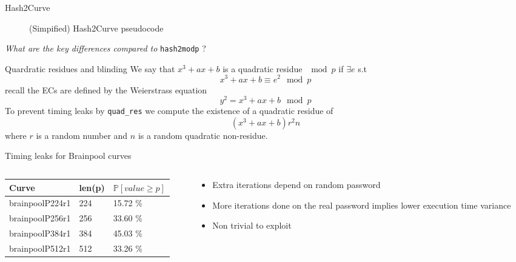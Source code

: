 \documentclass[xcolor=table]{bredelebeamer}
\begin{document}
\begin{frame}{Hash2Curve}
\begin{figure}
    \centering
\exampleCodeC
\caption{(Simpified) Hash2Curve pseudocode}
    \label{fig:my_label}
\end{figure}
    \Large{\textit{What are the key differences compared to} \texttt{hash2modp} ?}
\end{frame}
\begin{frame}{Quardratic residues and blinding}
    We say that $x^3+ax+b$ is a quadratic residue $\mod p$ if $\exists e$ s.t
    $$x^3+ax+b \equiv e^2 \mod p$$
    recall the ECs are defined by the Weierstrass equation
    $$y^2 = x^3 + ax + b \mod p$$
    To prevent timing leaks by \texttt{quad\_res} we compute the existence of a quadratic residue of
    $$(x^3+ax+b)r^2n$$
    where $r$ is a random number and $n$ is a random quadratic non-residue.
\end{frame}
\begin{frame}{Timing leaks for Brainpool curves}
\exampleCodeD

\begin{columns}
\begin{column}{0.6\textwidth}  %
\begin{table}[]
\begin{tabular}{@{}lll@{}}
\toprule
Curve           & len(p) & $\mathbb{P}[value \geq p]$ \\ \midrule
brainpoolP224r1 & 224    & 15.72 \%                   \\
brainpoolP256r1 & 256    & 33.60 \%                   \\
brainpoolP384r1 & 384    & 45.03 \%                   \\
brainpoolP512r1 & 512    & 33.26 \%                   \\ \bottomrule
\end{tabular}
\end{table}
\end{column}
\begin{column}{0.4\textwidth}
\begin{itemize}
    \item Extra iterations depend on random password
    \item More iterations done on the real password implies lower execution time variance
    \item Non trivial to exploit
\end{itemize}    
\end{column}
\end{columns}
\end{frame}
\end{document}
